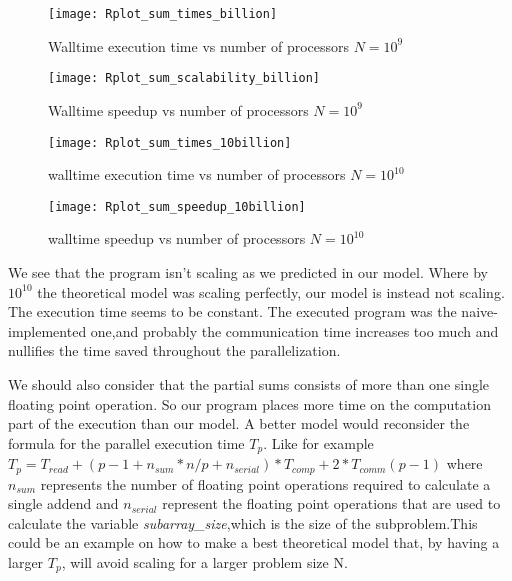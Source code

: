 \documentclass[11pt]{scrartcl} %
\begin{document}
\begin{figure}[H] %
	\centering
	\texttt{[image: Rplot\_sum\_times\_billion]} %
	\caption{Walltime execution time vs number of processors $N= 10^9$}
\end{figure}
\begin{figure}[H] %
	\centering
	\texttt{[image: Rplot\_sum\_scalability\_billion]} %
	\caption{Walltime speedup vs number of processors $N= 10^9$}
\end{figure}

\begin{figure}[H] %
	\centering
	\texttt{[image: Rplot\_sum\_times\_10billion]} %
	\caption{walltime execution time vs number of processors $N= 10^{10}$}
\end{figure}
\begin{figure}[H] %
	\centering
	\texttt{[image: Rplot\_sum\_speedup\_10billion]} %
	\caption{walltime speedup vs number of processors $N= 10^{10}$}
\end{figure}

We see that the program isn't scaling as we predicted in our model.
Where by $10^10$ the theoretical model was scaling perfectly, our model is instead not scaling.
The execution time seems to be constant.
The executed program was the naive-implemented one,and probably the communication time increases too much and nullifies the time saved throughout the parallelization. 

We should also consider that the partial sums consists of more than one single floating point operation. So our program places more time on the computation part of the execution than our model. A better model would reconsider the formula for the parallel execution time $T_p$. Like for example $T_p = T_{read} + (p-1+n_{sum}*n/p+n_{serial})*T_{comp}+2*T_{comm}(p-1)$ where $n_{sum}$ represents the number of floating point operations required to calculate a single addend and $n_{serial}$ represent the floating point operations that are used to calculate the variable \textit{subarray\_size},which is the size of the subproblem.This could be an example on how to make a best theoretical model that, by having a larger $T_p$, will avoid scaling for a larger problem size N. 
\end{document}
